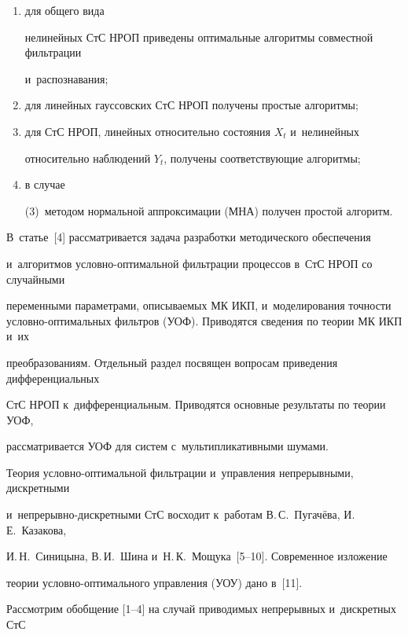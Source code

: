 \begin{enumerate}[(1)]

\item для общего вида 

нелинейных СтС НРОП приведены оптимальные алгоритмы совместной фильтрации 

и~распознавания; 

\item для линейных гауссовских СтС НРОП получены простые алгоритмы; 

\item для СтС НРОП, линейных относительно состояния $X_t$ и~нелинейных 

относительно наблюдений $Y_t$, получены соответствующие  алгоритмы; 

\item в случае 

(3)~методом нормальной аппроксимации (МНА) получен простой алгоритм.

\end{enumerate}





В~статье~[4] рассматривается задача разработки методического обеспечения 

и~алгоритмов услов\-но-оп\-ти\-маль\-ной фильт\-ра\-ции процессов в~СтС НРОП со случайными 

переменными параметрами, описываемых МК ИКП, и~моделирования точности услов\-но-оп\-ти\-маль\-ных фильт\-ров (УОФ). Приводятся сведения по тео\-рии МК ИКП и~их 

преобразованиям. Отдельный раздел посвящен вопросам приведения дифференциальных 

СтС НРОП к~дифференциальным. Приводятся основные результаты по теории УОФ, 

рассматривается УОФ для систем с~мультипликативными шумами.



Теория условно-оп\-ти\-маль\-ной фильтрации и~управления непрерывными, дискретными 

и~не\-пре\-рыв\-но-дис\-крет\-ны\-ми СтС восходит к~работам В.\,С.~Пугачёва, И.\,Е.~Казакова, 

И.\,Н.~Синицына, В.\,И.~Шина и~Н.\,К.~Мощука~[5--10]. Современное изложение 

тео\-рии услов\-но-оп\-ти\-маль\-но\-го управ\-ле\-ния (УОУ) дано в~[11].



Рассмотрим обобщение [1--4] на случай приводимых непрерывных и~дискретных СтС 


